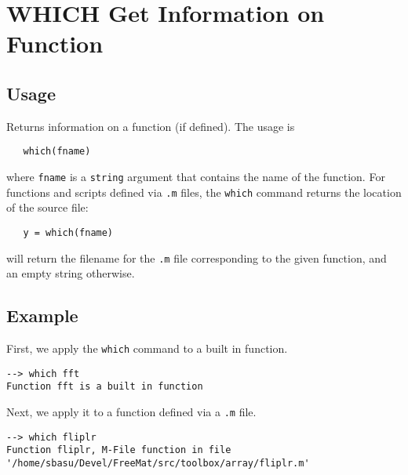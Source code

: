 \section{WHICH Get Information on Function}

\subsection{Usage}

Returns information on a function (if defined).  The usage is
\begin{verbatim}
   which(fname)
\end{verbatim}
where \verb|fname| is a \verb|string| argument that contains the name of the 
function.  For functions and scripts defined
via \verb|.m| files, the \verb|which| command returns the location of the source
file:
\begin{verbatim}
   y = which(fname)
\end{verbatim}
will return the filename for the \verb|.m| file corresponding to the given
function, and an empty string otherwise.
\subsection{Example}

First, we apply the \verb|which| command to a built in function.
\begin{verbatim}
--> which fft
Function fft is a built in function
\end{verbatim}
Next, we apply it to a function defined via a \verb|.m| file.
\begin{verbatim}
--> which fliplr
Function fliplr, M-File function in file '/home/sbasu/Devel/FreeMat/src/toolbox/array/fliplr.m'
\end{verbatim}
